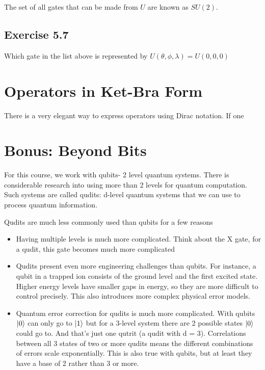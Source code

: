 \documentclass{book}
\begin{document}
The set of all gates that can be made from $U$ are known as $SU(2)$. \newline
\hline
\subsection{Exercise 5.7}
Which gate in the list above is represented by  $U(\theta, \phi, \lambda) = U(0,0,0)$ \newline 
\hline

\section{ Operators in Ket-Bra Form}




There is a very elegant way to express operators using Dirac notation. If one 

\section{ Bonus: Beyond Bits }

For this course, we work with qubits- 2 level quantum systems. There is considerable research into using more than 2 levels for quantum computation. Such systems are called qudits: d-level quantum systems that we can use to process quantum information. 

Qudits are much less commonly used than qubits for a few reasons
\begin{itemize}
\item Having multiple levels is much more complicated. Think about the X gate, for a qudit, this gate becomes much more complicated

\item Qudits present even more engineering challenges than qubits. For instance, a qubit in a trapped ion consists of the ground level and the first excited state. Higher energy levels have smaller gaps in energy, so they are more difficult to control precisely. This also introduces more complex physical error models. 

\item Quantum error correction for qudits is much more complicated. With qubits $\ket{0}$ can only go to $\ket{1}$ but for a 3-level system there are 2 possible states $\ket{0}$ could go to. And that's just one qutrit (a qudit with d = 3). Correlations between all 3 states of two or more qudits means the different combinations of errors scale exponentially. This is also true with qubits, but at least they have a base of 2 rather than 3 or more.
\end{itemize}
\end{document}

